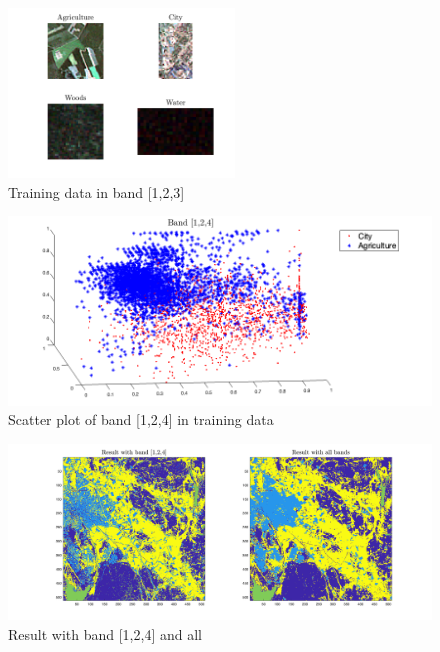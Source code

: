 \documentclass[oneside,a4paper]{article}
\begin{document}
\begin{figure}[ht!]
\centering
\includegraphics[width=60mm]{figures/training.png}
\caption{Training data in band [1,2,3]}
\label{fig:Q5train}
\end{figure}

\newpage




\begin{figure}[ht!]
\centering
\includegraphics[width=140mm]{figures/Q5.png}
\caption{Scatter plot of band [1,2,4] in training data}
\label{fig:Q5}
\end{figure}

\begin{figure}[ht!]
\centering
\includegraphics[width=150mm]{figures/result.png}
\caption{Result with band [1,2,4] and all}
\label{fig:result}
\end{figure}
\end{document}
